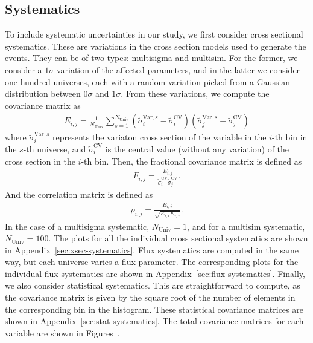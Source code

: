 \documentclass{article}
\begin{document}
\clearpage

\subsection{Systematics}

To include systematic uncertainties in our study, we first consider cross sectional systematics.
These are variations in the cross section models used to generate the events. They can be of two types:
multisigma and multisim. For the former, we consider a $1\sigma$ variation of the affected parameters, 
and in the latter we consider one hundred universes, each with a random variation picked from a 
Gaussian distribution between $0\sigma$ and $1\sigma$. From these variations, we compute the covariance matrix 
as 
\begin{align}
    E_{i,j} = \frac{1}{N_{\text{Univ}}} \sum_{s = 1}^{N_{\text{Univ}}} (\tilde{\sigma}_i^{\text{Var}, s} - \tilde{\sigma}_i^\text{CV})(\tilde{\sigma}_j^{\text{Var}, s} - \tilde{\sigma}_j^\text{CV})
\end{align}
where $\tilde{\sigma}_i^{\text{Var}, s}$ represents the variaton cross section of the variable in the $i$-th 
bin in the $s$-th universe, and $\tilde{\sigma}_i^\text{CV}$ is the central value (without any variation) 
of the cross section in the $i$-th bin. Then, the fractional covariance matrix is defined as 
\begin{align}
    F_{i,j} = \frac{E_{i,j}}{\tilde{\sigma}_i^\text{CV} \tilde{\sigma}_j^\text{CV}}.
\end{align}
And the correlation matrix is defined as
\begin{align}
    \rho_{i,j} = \frac{E_{i,j}}{\sqrt{E_{i,i} E_{j,j}}}.
\end{align}
In the case of a multisigma systematic, $N_{\text{Univ}} = 1$, and for a multisim systematic, $N_{\text{Univ}} = 100$.
The plots for all the individual cross sectional systematics are shown in Appendix~\ref{sec:xsec-systematics}. 
Flux systematics are computed in the same way, but each universe varies a flux parameter.
The corresponding plots for the individual flux systematics are shown in Appendix~\ref{sec:flux-systematics}.
Finally, we also consider statistical systematics. This are straightforward to compute, as the covariance matrix 
is given by the square root of the number of elements in the corresponding bin in the histogram. These statistical
covariance matrices are shown in Appendix~\ref{sec:stat-systematics}.
The total covariance matrices for each variable are shown in Figures~.
\end{document}
